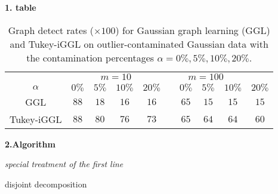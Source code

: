 \documentclass{article}
\begin{document}
\textbf{1. table}
\begin{center}\begin{table}[htb!]
\begin{centering}
\begin{tabular}{cccccccccc}
\hline 
 & \multicolumn{4}{c}{$m=10$} & \multicolumn{4}{c}{$m=100$}\\
 \cmidrule(l){2-5} \cmidrule(l){6-9}
$\alpha$ & $0\%$ & $5\%$ & $10\%$ & $20\%$ && $0\%$ & $5\%$ & $10\%$ & $20\%$\\
\hline 
GGL & $88$ & $18$ & $16$ & $16$ && $65$ & $15$ & $15$ & $15$\\
Tukey-iGGL & $88$ & $80$ & $76$ & $73$ && $65$ & $64$ & $64$ & $60$\\
\hline 
\end{tabular}
\par\end{centering}
\caption{Graph detect rates ($\times 100$) for Gaussian graph learning (GGL) and Tukey-iGGL on outlier-contaminated Gaussian data with  the contamination percentages $\alpha=0\%, 5\%, 10\%, 20\%$.}
\label{Gaussian simulation}
\end{table}
\par\end{center}


%

\textbf{2.Algorithm}
\begin{algorithm}[htb!]
\BlankLine
\emph{special treatment of the first line}\;
\caption{disjoint decomposition}\label{algo_disjdecomp}
\end{algorithm}\DecMargin{1em}
\end{document}

